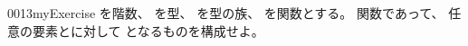 \documentclass[index]{subfiles}
\begin{document}
\begin{myBlock}{0013}{myExercise}
  を階数、
  を型、
  を型の族、
  を関数とする。
  関数であって、
  任意の要素とに対して
  となるものを構成せよ。
\end{myBlock}
\end{document}
